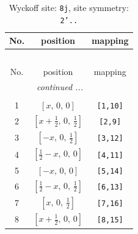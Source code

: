 \documentclass[fleqn,8pt]{jsarticle}
\begin{document}
\begin{longtable}{ccc}
\caption{Wyckoff site: {\tt 8j}, site symmetry: {\tt 2'..}}
 \\
 \hline \hline
No. & position & mapping \\ \hline \endfirsthead

\multicolumn{2}{l}{\tablename\ \thetable{}} \\
 \hline \hline
No. & position & mapping \\ \hline \endhead

 \hline \hline
\multicolumn{2}{r}{\footnotesize\it continued ...} \\ \endfoot

 \hline \hline
\multicolumn{2}{r}{} \\ \endlastfoot

1 & $\left[ x,\, 0,\, 0 \right]$ & {\tt [1,10]} \\ \hline
2 & $\left[ x + \frac{1}{2},\, 0,\, \frac{1}{2} \right]$ & {\tt [2,9]} \\ \hline
3 & $\left[ - x,\, 0,\, \frac{1}{2} \right]$ & {\tt [3,12]} \\ \hline
4 & $\left[ \frac{1}{2} - x,\, 0,\, 0 \right]$ & {\tt [4,11]} \\ \hline
5 & $\left[ - x,\, 0,\, 0 \right]$ & {\tt [5,14]} \\ \hline
6 & $\left[ \frac{1}{2} - x,\, 0,\, \frac{1}{2} \right]$ & {\tt [6,13]} \\ \hline
7 & $\left[ x,\, 0,\, \frac{1}{2} \right]$ & {\tt [7,16]} \\ \hline
8 & $\left[ x + \frac{1}{2},\, 0,\, 0 \right]$ & {\tt [8,15]} \\
\end{longtable}
\renewcommand{\arraystretch}{1.2}
\end{document}
